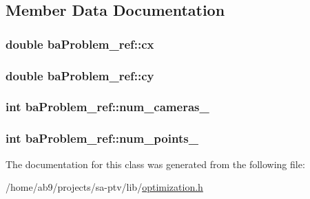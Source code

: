 \subsection{Member Data Documentation}
\hypertarget{classbaProblem__ref_a7f8a2c3626cbd11ac8aba36d8fb24558}{
\subsubsection[{cx}]{\setlength{\rightskip}{0pt plus 5cm}double ba\-Problem\-\_\-ref\-::cx}}\label{d2/d3f/classbaProblem__ref_a7f8a2c3626cbd11ac8aba36d8fb24558}
\hypertarget{classbaProblem__ref_a6dd08234b8f251edf79d66d2f800a905}{
\subsubsection[{cy}]{\setlength{\rightskip}{0pt plus 5cm}double ba\-Problem\-\_\-ref\-::cy}}\label{d2/d3f/classbaProblem__ref_a6dd08234b8f251edf79d66d2f800a905}
\hypertarget{classbaProblem__ref_aa66f29e12cd960cab710165a755f0b35}{
\subsubsection[{num\-\_\-cameras\-\_\-}]{\setlength{\rightskip}{0pt plus 5cm}int ba\-Problem\-\_\-ref\-::num\-\_\-cameras\-\_\-}}\label{d2/d3f/classbaProblem__ref_aa66f29e12cd960cab710165a755f0b35}
\hypertarget{classbaProblem__ref_a970268458224931ac624358248d1a7cc}{
\subsubsection[{num\-\_\-points\-\_\-}]{\setlength{\rightskip}{0pt plus 5cm}int ba\-Problem\-\_\-ref\-::num\-\_\-points\-\_\-}}\label{d2/d3f/classbaProblem__ref_a970268458224931ac624358248d1a7cc}


The documentation for this class was generated from the following file\-:\begin{DoxyCompactItemize}
\item 
/home/ab9/projects/sa-\/ptv/lib/\hyperlink{optimization_8h}{optimization.\-h}\end{DoxyCompactItemize}

